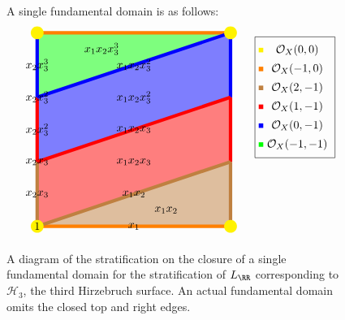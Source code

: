 \documentclass{amsart}
\begin{document}
\begin{figure}
  A single fundamental domain is as follows:
\[
\begin{tikzpicture}[scale=2]
\fill[opacity=0.5, green] (0,2) -- (0,3) -- (3,3) -- cycle;
\fill[opacity=0.5, blue] (0,1) -- (0,2) -- (3,3) -- (3,2) -- (0,1);
\fill[opacity=0.5, red] (0,0) -- (0,1) -- (3,2) -- (3,1) -- (0,0);
\fill[opacity=0.5, brown] (0,0) -- (3,1) -- (3,0) -- (0,0);

\draw[line width=3pt, brown] (0,0) -- (0,1);
\draw[line width=3pt, red] (0,1) -- (0,2);
\draw[line width=3pt, blue] (0,2)-- (0,3);
\draw[line width=3pt, orange] (0,3) -- (3,3);

\draw[line width=3pt, brown] (3,0) -- (3,1);
\draw[line width=3pt, red] (3,1) -- (3,2);
\draw[line width=3pt, blue] (3,2)-- (3,3);


\draw[line width=3pt, orange] (3,0) -- (0,0);
\draw[line width=3pt, brown] (0,0) -- (3,1);
\draw[line width=3pt, red] (0,1) -- (3,2);
\draw[line width=3pt, blue] (0,2) -- (3,3);


\node[fill, circle, yellow, inner sep = 4pt] at (0,0) {};
\node[fill, circle, yellow, inner sep = 4pt] at (3,0) {};
\node[fill, circle, yellow, inner sep = 4pt] at (3,3) {};
\node[fill, circle, yellow, inner sep = 4pt] at (0,3) {};
\node at (0,0) {$1$};
\node at (0,1) {$x_2x_3$};
\node at (0,2) {$x_2x_3^2$};

\node at (1.5,0) {$x_1$};

\node at (0,0.5) {$x_2x_3$};
\node at (0,1.5) {$x_2x_3^2$};
\node at (0,2.5) {$x_2x_3^3$};


\node at (1.5,0.5) {$x_1x_2$};
\node at (1.5,1.5) {$x_1x_2x_3$};
\node at (1.5,2.5) {$x_1x_2x_3^2$};

\node at (2,0.25) {$x_1x_2$};
\node at (1.5,1) {$x_1x_2x_3$};
\node at (1.5,2) {$x_1x_2x_3^2$};
\node at (1,2.75) {$x_1x_2x_3^3$};

\matrix[draw] at (4,2) {
  \node[fill=yellow,inner sep = 2pt] {}; & \node {$\cO_{X}(0,0)$};\\
  \node[fill=orange,inner sep = 2pt] {}; & \node {$\cO_{X}(-1,0)$};\\
  \node[fill=brown,inner sep = 2pt] {}; & \node {$\cO_{X}(2,-1)$};\\
  \node[fill=red,inner sep = 2pt] {}; & \node {$\cO_{X}(1,-1)$};\\
  \node[fill=blue,inner sep = 2pt] {}; & \node {$\cO_{X}(0,-1)$};\\
  \node[fill=green,inner sep = 2pt] {}; & \node {$\cO_{X}(-1,-1)$};\\
};

\end{tikzpicture}
\]
\caption{A diagram of the stratification on the closure of a single fundamental domain for the
stratification of $L_\RR$ corresponding to $\mathcal H_3$, the third Hirzebruch surface. An actual fundamental domain omits the closed top and right edges. }
\label{fig:hirzebruch-stratification}
\end{figure}
\end{document}
